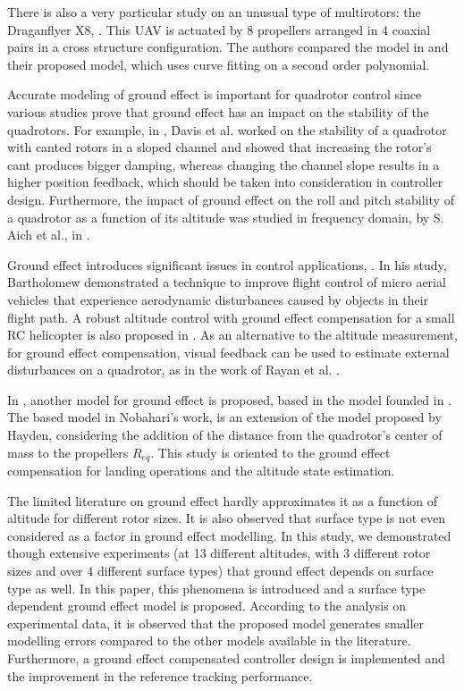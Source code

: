 \documentclass[twocolumn,10pt]{asme2ej}
\begin{document}
There is also a very particular study on an unusual type of multirotors: the Draganflyer X8, \cite{Sharf2014}. This UAV is actuated by 8 propellers arranged in 4 coaxial pairs in a cross structure configuration. The authors compared the model in \cite{Cheeseman1955} and their proposed model, which uses curve fitting on a second order polynomial. 

Accurate modeling of ground effect is important for quadrotor control since various studies prove that ground effect has an impact on the stability of the quadrotors. For example, in \cite{Davis2016}, Davis et al. worked on the stability of a quadrotor with canted rotors in a sloped channel and showed that increasing the rotor's cant produces bigger damping, whereas changing the channel slope results in a higher position feedback, which should be taken into consideration in controller design. Furthermore, the impact of ground effect on the roll and pitch stability of a quadrotor as a function of its altitude was studied in frequency domain, by S. Aich et al., in \cite{Aich2014}. 

Ground effect introduces significant issues in control applications, \cite{Bartholomew2015}. In his study, Bartholomew demonstrated a technique to improve flight control of micro aerial vehicles that experience aerodynamic disturbances caused by objects in their flight path. A robust altitude control with ground effect compensation for a small RC helicopter is also proposed in \cite{Nonaka2011}. As an alternative to the altitude measurement, for ground effect compensation, visual feedback can be used to estimate external disturbances on a quadrotor, as in the work of Rayan et al. \cite{Ryan2012}.

In \cite{Nobahari2014}, another model for ground effect is proposed, based in the model founded in \cite{Hayden1976}. The based model in Nobahari's work, is an extension of the model proposed by Hayden, considering the addition of the distance from the quadrotor's center of mass to the propellers $R_{eq}$. This study is oriented to the ground effect compensation for landing operations and the altitude state estimation. 

The limited literature on ground effect hardly  approximates it as a function of altitude for different rotor sizes. It is also observed that surface type is not even considered as a factor in ground effect modelling. In this study, we demonstrated though extensive experiments (at 13 different altitudes, with 3 different rotor sizes and over 4 different surface types) that ground effect depends on surface type as well. In this paper, this phenomena is introduced and a surface type dependent ground effect model is proposed. According to the analysis on experimental data, it is observed that the proposed model generates smaller modelling errors compared to the other models available in the literature. Furthermore, a ground effect compensated controller design is implemented and the improvement in the reference tracking performance. 
\end{document}
